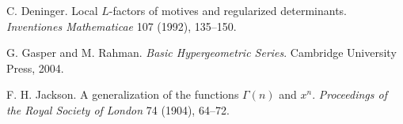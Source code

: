  C. Deninger. Local $L$-factors of motives and regularized determinants. \emph{Inventiones Mathematicae} 107 (1992), 135--150.

 G. Gasper and M. Rahman. \emph{Basic Hypergeometric Series}. Cambridge University Press, 2004.

 F. H. Jackson. A generalization of the functions $\Gamma(n)$ and $x^n$. \emph{Proceedings of the Royal Society of London} 74 (1904), 64--72.
